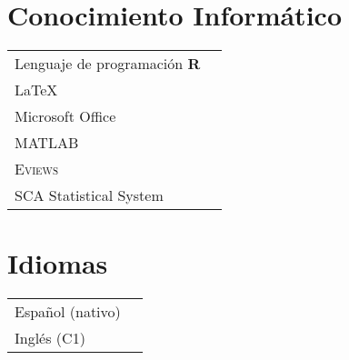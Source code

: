 \documentclass[11pt]{article}\usepackage[]{graphicx}\usepackage[]{color}
\begin{document}
\section{Conocimiento Informático} 

\begin{tabular}{ll}

Lenguaje de programación \textbf{\textsf{R}}\\
{\LaTeX}\\
Microsoft Office\\
\textsc{MATLAB}\\
\textsc{Eviews}\\
SCA Statistical System\\

\end{tabular}
\vspace{10pt}

\section{Idiomas} 

\begin{tabular}{ll}
Español (nativo)\\
Inglés (C1) 

\end{tabular}
\end{document}
